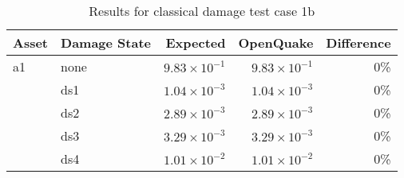 \begin{table}[htbp]

\centering
\begin{tabular}{ l l r r r }

\hline
\rowcolor{anti-flashwhite}
\bf{Asset} & \bf{Damage State} & \bf{Expected} & \bf{OpenQuake} & \bf{Difference}\\
\hline
a1 & none & $9.83 \times 10^{-1}$ & $9.83 \times 10^{-1}$ & 0\% \\
   & ds1 & $1.04 \times 10^{-3}$ & $1.04 \times 10^{-3}$ & 0\% \\
   & ds2 & $2.89 \times 10^{-3}$ & $2.89 \times 10^{-3}$ & 0\% \\
   & ds3 & $3.29 \times 10^{-3}$ & $3.29 \times 10^{-3}$ & 0\% \\
   & ds4 & $1.01 \times 10^{-2}$ & $1.01 \times 10^{-2}$ & 0\% \\
\hline
\end{tabular}

\caption{Results for classical damage test case 1b}
\label{tab:result-cd-1b}
\end{table}